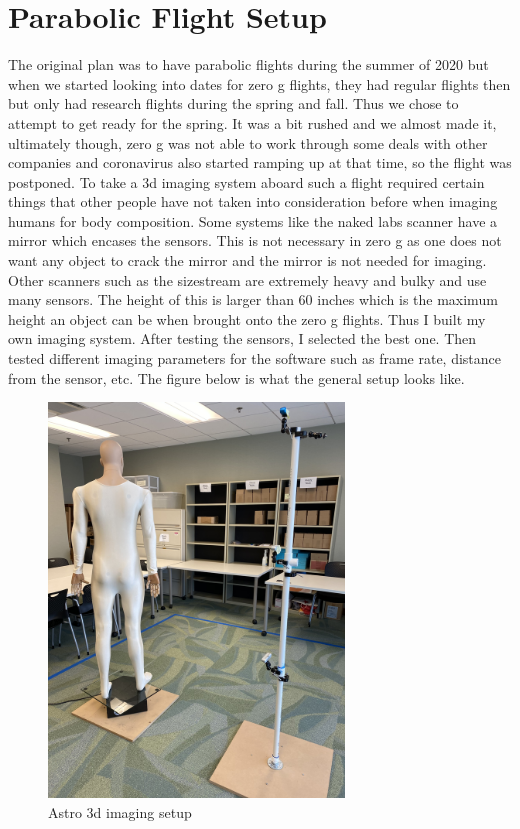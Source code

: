 \section{Parabolic Flight Setup}
The original plan was to have parabolic flights during the summer of 2020 but when we started looking into dates for zero g flights, they had regular flights then but only had research flights during the spring and fall. Thus we chose to attempt to get ready for the spring. It was a bit rushed and we almost made it, ultimately though, zero g was not able to work through some deals with other companies and coronavirus also started ramping up at that time, so the flight was postponed.
To take a 3d imaging system aboard such a flight required certain things that other people have not taken into consideration before when imaging humans for body composition. Some systems like the naked labs scanner have a mirror which encases the sensors. This is not necessary in zero g as one does not want any object to crack the mirror and the mirror is not needed for imaging. Other scanners such as the sizestream are extremely heavy and bulky and use many sensors. The height of this is larger than 60 inches which is the maximum height an object can be when brought onto the zero g flights. Thus I built my own imaging system. After testing the sensors, I selected the best one. Then tested different imaging parameters for the software such as frame rate, distance from the sensor, etc.
The figure below is what the general setup looks like.
\begin{figure}[h]
	\caption{Astro 3d imaging setup}
	\centering
	\includegraphics[width=0.7\textwidth, angle=-90]{images/astro_setup.jpg}
\end{figure}

